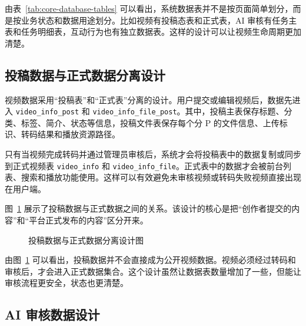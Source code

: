 由表~\ref{tab:core-database-tables} 可以看出，系统数据表并不是按页面简单划分，而是按业务状态和数据用途划分。比如视频有投稿态表和正式表，AI 审核有任务主表和任务明细表，互动行为也有独立数据表。这样的设计可以让视频生命周期更加清楚。

\subsection{投稿数据与正式数据分离设计}
\label{subsec:post-official-data-design}

视频数据采用“投稿表”和“正式表”分离的设计。用户提交或编辑视频后，数据先进入 \texttt{video\_info\_post} 和 \texttt{video\_info\_file\_post}。其中，投稿主表保存标题、分类、标签、简介、状态等信息，投稿文件表保存每个分 P 的文件信息、上传标识、转码结果和播放资源路径。

只有当视频完成转码并通过管理员审核后，系统才会将投稿表中的数据复制或同步到正式视频表 \texttt{video\_info} 和 \texttt{video\_info\_file}。正式表中的数据才会被前台列表、搜索和播放功能使用。这样可以有效避免未审核视频或转码失败视频直接出现在用户端。

图~\ref{fig:post-official-data} 展示了投稿数据与正式数据之间的关系。该设计的核心是把“创作者提交的内容”和“平台正式发布的内容”区分开来。

\begin{figure}[htbp]
  \centering
  \caption{投稿数据与正式数据分离设计图}
  \label{fig:post-official-data}
\end{figure}

由图~\ref{fig:post-official-data} 可以看出，投稿数据并不会直接成为公开视频数据。视频必须经过转码和审核后，才会进入正式数据集合。这个设计虽然让数据表数量增加了一些，但能让审核流程更安全，状态也更清楚。

\subsection{AI 审核数据设计}
\label{subsec:ai-audit-data-design}

